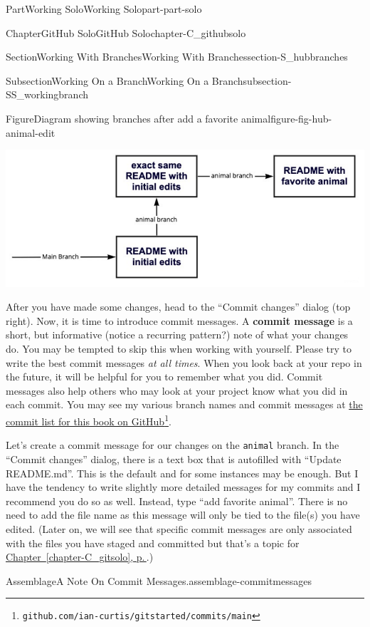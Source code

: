 \documentclass[twoside,10pt,]{book}
\newcommand{\xreffont}{\relax}
\newcommand{\mono}[1]{\texttt{#1}}
\newcommand{\terminology}[1]{\textbf{#1}}
\begin{document}
\begin{partptx}{Part}{Working Solo}{}{Working Solo}{}{}{part-part-solo}
\begin{chapterptx}{Chapter}{GitHub Solo}{}{GitHub Solo}{}{}{chapter-C_githubsolo}
\begin{sectionptx}{Section}{Working With Branches}{}{Working With Branches}{}{}{section-S_hubbranches}
\begin{subsectionptx}{Subsection}{Working On a Branch}{}{Working On a Branch}{}{}{subsection-SS_workingbranch}
\begin{figureptx}{Figure}{Diagram showing branches after add a favorite animal}{figure-fig-hub-animal-edit}{}
\begin{image}{0}{1}{0}{}%
\includegraphics[width=\linewidth]{external/hub_animal_edit.pdf}
\end{image}%
\tcblower
\end{figureptx}%
 After you have made some changes, head to the ``Commit changes'' dialog (top right). Now, it is time to introduce commit messages. A \terminology{commit message} is a short, but informative (notice a recurring pattern?) note of what your changes do. You may be tempted to skip this when working with yourself. Please try to write the best commit messages \emph{at all times}. When you look back at your repo in the future, it will be helpful for you to remember what you did. Commit messages also help others who may look at your project know what you did in each commit. You may see my various branch names and commit messages at \href{https://github.com/ian-curtis/gitstarted/commits/main}{the commit list for this book on GitHub}\footnote{\nolinkurl{github.com/ian-curtis/gitstarted/commits/main}\label{fn-SS_workingbranch-g-h}}.%
\par
Let's create a commit message for our changes on the \mono{animal} branch. In the ``Commit changes'' dialog, there is a text box that is autofilled with ``Update README.md''. This is the default and for some instances may be enough. But I have the tendency to write slightly more detailed messages for my commits and I recommend you do so as well. Instead, type ``add favorite animal''. There is no need to add the file name as this message will only be tied to the file(s) you have edited. (Later on, we will see that specific commit messages are only associated with the files you have staged and committed but that's a topic for \hyperref[chapter-C_gitsolo]{Chapter~{\xreffont\ref{chapter-C_gitsolo}}, p.\,\pageref{chapter-C_gitsolo}}.)%
\begin{assemblage}{Assemblage}{A Note On Commit Messages.}{assemblage-commitmessages}%

\end{assemblage}
\end{subsectionptx}
\end{sectionptx}
\end{chapterptx}
\end{partptx}
\end{document}
